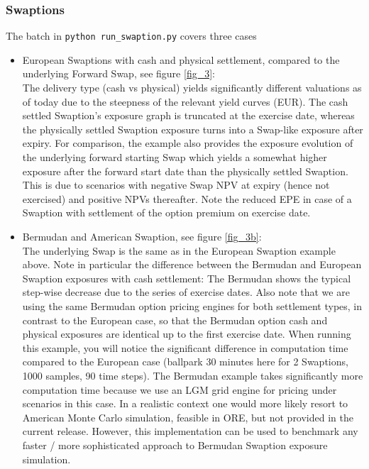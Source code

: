 \subsubsection{Swaptions}\label{example:exposure_swaptions}

The batch in {\tt python run\_swaption.py} covers three cases
\begin{itemize}
\item European Swaptions with cash and physical settlement, compared to the underlying Forward Swap, see figure \ref{fig_3}:\\
  The delivery type (cash vs physical) yields significantly different valuations as of today due to the steepness of the
  relevant yield curves (EUR). The cash settled Swaption's exposure graph is truncated at the exercise date, whereas the
  physically settled Swaption exposure turns into a Swap-like exposure after expiry. For comparison, the example also
  provides the exposure evolution of the underlying forward starting Swap which yields a somewhat higher exposure after
  the forward start date than the physically settled Swaption. This is due to scenarios with negative Swap NPV at expiry
  (hence not exercised) and positive NPVs thereafter. Note the reduced EPE in case of a Swaption with settlement of the
  option premium on exercise date.
\item Bermudan and American Swaption, see figure \ref{fig_3b}: \\
  The underlying Swap is the same as in the European Swaption example above. Note in
  particular the difference between the Bermudan and European Swaption exposures with cash settlement: The Bermudan shows
  the typical step-wise decrease due to the series of exercise dates. Also note that we are using the same Bermudan option
  pricing engines for both settlement types, in contrast to the European case, so that the Bermudan option cash and
  physical exposures are identical up to the first exercise date. When running this example, you will notice the
  significant difference in computation time compared to the European case (ballpark 30 minutes here for 2 Swaptions, 1000
  samples, 90 time steps). The Bermudan example takes significantly more computation time because we use an LGM grid
  engine for pricing under scenarios in this case. In a realistic context one would more likely resort to American Monte
  Carlo simulation, feasible in ORE, but not provided in the current release. However, this implementation can be used to
  benchmark any faster / more sophisticated approach to Bermudan Swaption exposure simulation.

\end{itemize}
